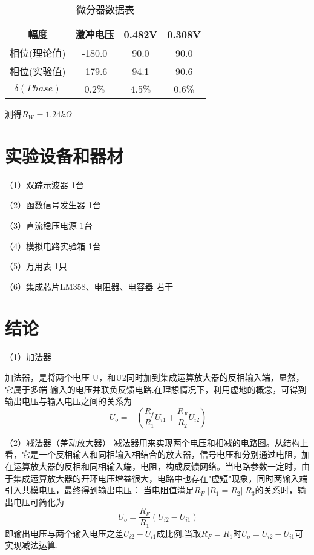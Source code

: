 \documentclass{article}
\begin{document}
          
            \begin{table}[h]
                \centering  
                \begin{tabular}{c|c|c|c}
                    \hline
                       幅度     & 激冲电压    & 0.482V   & 0.308V  \\ \hline
                      相位(理论值) &   -180.0       & 90.0        &90.0        \\ \hline
                      相位(实验值) &  -179.6       &94.1         &90.6      \\ \hline
                        $ \delta(Phase) $ &0.2\%&4.5\%&0.6\% \\ \hline
                \end{tabular}
              
                \caption{微分器数据表}\label{SIGN}
                \end{table}
                \par
                测得$R_W=1.24k\Omega$
              \newpage
	\section{ 实验设备和器材}
	（1）双踪示波器             \qquad \qquad \qquad \qquad \qquad  \qquad           1台\par
	（2）函数信号发生器          \qquad  \qquad \qquad \qquad       \qquad           1台\par
	（3）直流稳压电源             \qquad \quad \qquad \qquad \qquad \qquad           1台\par
	（4）模拟电路实验箱            \qquad  \qquad \qquad \qquad\qquad                1台\par
	（5）万用表                   \qquad  \qquad \qquad \qquad \qquad \qquad \qquad  1只\par
	（6）集成芯片LM358、电阻器、电容器  \quad                                        若干

\section{结论}
（1）加法器\par
加法器，是将两个电压 U，和U2同时加到集成运算放大器的反相输入端，显然，它属于多端
输入的电压并联负反馈电路.在理想情况下，利用虚地的概念，可得到输出电压与输入电压之间的关系为
\begin{equation*}
 \ U_o=-(\frac{R_f}{R_1}U_{i1}+\frac{R_F}{R_2}U_{i2})
\end{equation*}
\par
（2）减法器（差动放大器）
减法器用来实现两个电压和相减的电路图。从结构上看，它是一个反相输人和同相输入相结合的放大器，信号电压和分别通过电阻，加在运算放大器的反相和同相输入端，电阻，构成反馈网络。当电路参数一定时，由于集成运算放大器的开环电压增益很大，电路中也存在"虚短"现象，同时两输入端引入共模电压，最终得到输出电压：
当电阻值满足$R_F||R_1=R_2||R_3$的关系时，输出电压可简化为
\begin{equation*}
 \  U_o=\frac{R_F}{R_1}(U_{i2}-U_{i1})
\end{equation*}
即输出电压与两个输入电压之差$U_{i2}-U_{i1}$成比例.当取${R_F}={R_1}$时$U_o=U_{i2}-U_{i1}$可实现减法运算.
\end{document}
